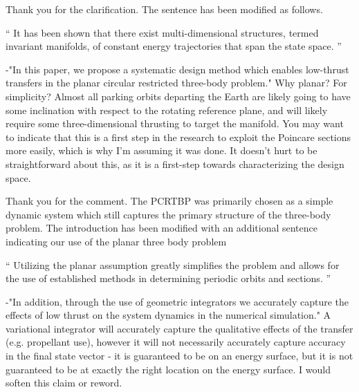\documentclass[11pt]{article}
\newenvironment{correction}{\begin{list}{}{\setlength{\leftmargin}{1cm}\setlength{\rightmargin}{1cm}}\vspace{\parsep}\item[]``}{''\end{list}}
\begin{document}
\begin{enumerate}
Thank you for the clarification.
The sentence has been modified as follows.

\begin{correction}
It has been shown that there exist multi-dimensional structures, termed invariant manifolds, of constant energy trajectories that span the state space. 
\end{correction}

\item 
    \begin{itshape}
-"In this paper, we propose a systematic design method which enables low-thrust transfers in the planar circular restricted three-body problem." Why planar?  For simplicity?  Almost all parking orbits departing the Earth are likely going to have some inclination with respect to the rotating reference plane, and will likely require some three-dimensional thrusting to target the manifold.  You may want to indicate that this is a first step in the research to exploit the Poincare sections more easily, which is why I'm assuming it was done.  It doesn't hurt to be straightforward about this, as it is a first-step towards characterizing the design space.
\end{itshape}

Thank you for the comment.
The PCRTBP was primarily chosen as a simple dynamic system which still captures the primary structure of the three-body problem.
The introduction has been modified with an additional sentence indicating our use of the planar three body problem

\begin{correction}
Utilizing the planar assumption greatly simplifies the problem and allows for the use of established methods in determining periodic orbits and \Poincare sections.
\end{correction}

\item 
    \begin{itshape}
-"In addition, through the use of geometric integrators we accurately capture the effects of low thrust on the system dynamics in the numerical simulation."  A variational integrator will accurately capture the qualitative effects of the transfer (e.g. propellant use), however it will not necessarily accurately capture accuracy in the final state vector - it is guaranteed to be on an energy surface, but it is not guaranteed to be at exactly the right location on the energy surface.  I would soften this claim or reword.
\end{itshape}


\end{enumerate}
\end{document}
